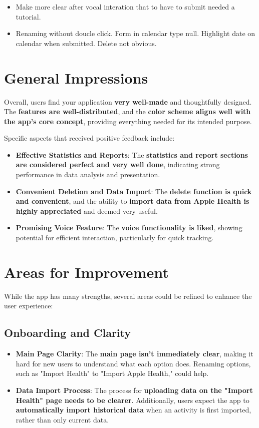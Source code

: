 \documentclass{article}
\begin{document}
\begin{itemize}
	\item Make more clear after vocal interation that to have to submit needed a tutorial.
	\item Renaming without doucle click. Form in calendar type null. Highlight date on calendar when submitted. Delete not obvious.
\end{itemize}

\section{General Impressions}

Overall, users find your application \textbf{very well-made} and thoughtfully designed. The \textbf{features are well-distributed}, and the \textbf{color scheme aligns well with the app's core concept}, providing everything needed for its intended purpose.

Specific aspects that received positive feedback include:

\begin{itemize}
    \item \textbf{Effective Statistics and Reports}: The \textbf{statistics and report sections are considered perfect and very well done}, indicating strong performance in data analysis and presentation.
    \item \textbf{Convenient Deletion and Data Import}: The \textbf{delete function is quick and convenient}, and the ability to \textbf{import data from Apple Health is highly appreciated} and deemed very useful.
    \item \textbf{Promising Voice Feature}: The \textbf{voice functionality is liked}, showing potential for efficient interaction, particularly for quick tracking.
\end{itemize}

\section{Areas for Improvement}

While the app has many strengths, several areas could be refined to enhance the user experience:

\subsection{Onboarding and Clarity}

\begin{itemize}
    \item \textbf{Main Page Clarity}: The \textbf{main page isn't immediately clear}, making it hard for new users to understand what each option does. Renaming options, such as "Import Health" to "Import Apple Health," could help.
    \item \textbf{Data Import Process}: The process for \textbf{uploading data on the "Import Health" page needs to be clearer}. Additionally, users expect the app to \textbf{automatically import historical data} when an activity is first imported, rather than only current data.
\end{itemize}
\end{document}
